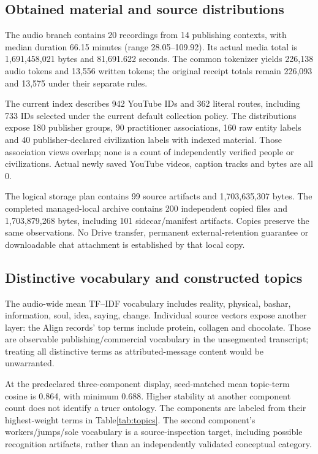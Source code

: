 \subsection{Obtained material and source distributions}

The audio branch contains 20 recordings from 14 publishing contexts, with median duration 66.15 minutes (range 28.05--109.92). Its actual media total is 1,691,458,021 bytes and 81,691.622 seconds. The common tokenizer yields 226,138 audio tokens and 13,556 written tokens; the original receipt totals remain 226,093 and 13,575 under their separate rules.

The current index describes 942 YouTube IDs and 362 literal routes, including 733 IDs selected under the current default collection policy. The distributions expose 180 publisher groups, 90 practitioner associations, 160 raw entity labels and 40 publisher-declared civilization labels with indexed material. Those association views overlap; none is a count of independently verified people or civilizations. Actual newly saved YouTube videos, caption tracks and bytes are all 0.

The logical storage plan contains 99 source artifacts and 1,703,635,307 bytes. The completed managed-local archive contains 200 independent copied files and 1,703,879,268 bytes, including 101 sidecar/manifest artifacts. Copies preserve the same observations. No Drive transfer, permanent external-retention guarantee or downloadable chat attachment is established by that local copy.

\subsection{Distinctive vocabulary and constructed topics}

The audio-wide mean TF--IDF vocabulary includes reality, physical, bashar, information, soul, idea, saying, change. Individual source vectors expose another layer: the Align records' top terms include protein, collagen and chocolate. Those are observable publishing/commercial vocabulary in the unsegmented transcript; treating all distinctive terms as attributed-message content would be unwarranted.

At the predeclared three-component display, seed-matched mean topic-term cosine is 0.864, with minimum 0.688. Higher stability at another component count does not identify a truer ontology. The components are labeled from their highest-weight terms in Table\ref{tab:topics}. The second component's workers/jumps/sole vocabulary is a source-inspection target, including possible recognition artifacts, rather than an independently validated conceptual category.

